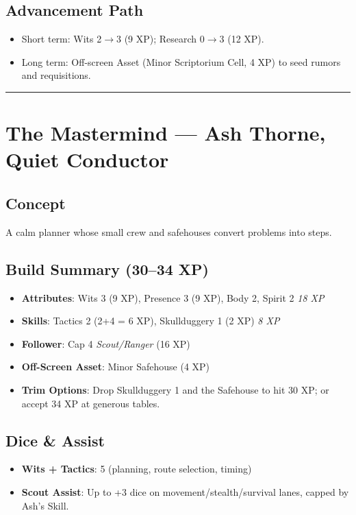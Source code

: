 \documentclass[12pt]{book}
\begin{document}
\subsection*{Advancement Path}
\begin{itemize}
  \item Short term: Wits 2$\rightarrow$3 (9 XP); Research 0$\rightarrow$3 (12 XP).
  \item Long term: Off-screen Asset (Minor Scriptorium Cell, 4 XP) to seed rumors and requisitions.
\end{itemize}

\bigskip
\hrule
\bigskip

\section{The Mastermind — Ash Thorne, Quiet Conductor}

\subsection*{Concept}
A calm planner whose small crew and safehouses convert problems into steps.

\subsection*{Build Summary (30–34 XP)}
\begin{itemize}
  \item \textbf{Attributes}: Wits 3 (9 XP), Presence 3 (9 XP), Body 2, Spirit 2 \hfill \emph{18 XP}
  \item \textbf{Skills}: Tactics 2 (2+4 = 6 XP), Skullduggery 1 (2 XP) \hfill \emph{8 XP}
  \item \textbf{Follower}: Cap 4 \emph{Scout/Ranger} (16 XP)
  \item \textbf{Off-Screen Asset}: Minor Safehouse (4 XP)
  \item \textbf{Trim Options}: Drop Skullduggery 1 and the Safehouse to hit 30 XP; or accept 34 XP at generous tables.
\end{itemize}

\subsection*{Dice \& Assist}
\begin{itemize}
  \item \textbf{Wits + Tactics}: 5 (planning, route selection, timing)
  \item \textbf{Scout Assist}: Up to +3 dice on movement/stealth/survival lanes, capped by Ash’s Skill.
\end{itemize}
\end{document}
